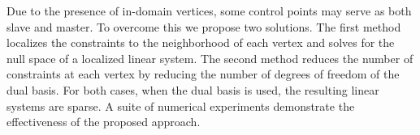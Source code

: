 Due to the presence of in-domain vertices, some control points may serve as both slave and master. To overcome this we propose two solutions. The first method localizes the constraints to the neighborhood of each vertex and solves for the null space of a localized linear system. The second method reduces the number of constraints at each vertex by reducing the number of degrees of freedom of the dual basis. For both cases, when the \Bezier dual basis is used, the resulting linear systems are sparse. A suite of numerical experiments demonstrate the effectiveness of the proposed approach. \par